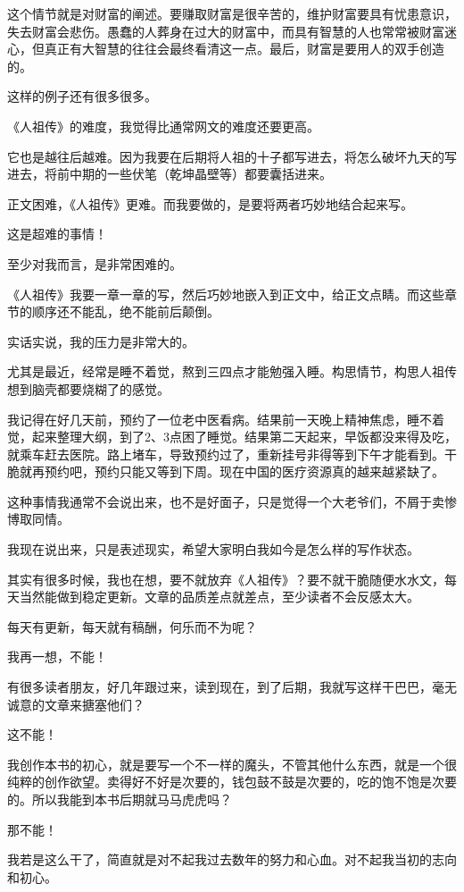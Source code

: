 \begin{this_body}
这个情节就是对财富的阐述。要赚取财富是很辛苦的，维护财富要具有忧患意识，失去财富会悲伤。愚蠢的人葬身在过大的财富中，而具有智慧的人也常常被财富迷心，但真正有大智慧的往往会最终看清这一点。最后，财富是要用人的双手创造的。

这样的例子还有很多很多。

《人祖传》的难度，我觉得比通常网文的难度还要更高。

它也是越往后越难。因为我要在后期将人祖的十子都写进去，将怎么破坏九天的写进去，将前中期的一些伏笔（乾坤晶壁等）都要囊括进来。

正文困难，《人祖传》更难。而我要做的，是要将两者巧妙地结合起来写。

这是超难的事情！

至少对我而言，是非常困难的。

《人祖传》我要一章一章的写，然后巧妙地嵌入到正文中，给正文点睛。而这些章节的顺序还不能乱，绝不能前后颠倒。

实话实说，我的压力是非常大的。

尤其是最近，经常是睡不着觉，熬到三四点才能勉强入睡。构思情节，构思人祖传想到脑壳都要烧糊了的感觉。

我记得在好几天前，预约了一位老中医看病。结果前一天晚上精神焦虑，睡不着觉，起来整理大纲，到了2、3点困了睡觉。结果第二天起来，早饭都没来得及吃，就乘车赶去医院。路上堵车，导致预约过了，重新挂号非得等到下午才能看到。干脆就再预约吧，预约只能又等到下周。现在中国的医疗资源真的越来越紧缺了。

这种事情我通常不会说出来，也不是好面子，只是觉得一个大老爷们，不屑于卖惨博取同情。

我现在说出来，只是表述现实，希望大家明白我如今是怎么样的写作状态。

其实有很多时候，我也在想，要不就放弃《人祖传》？要不就干脆随便水水文，每天当然能做到稳定更新。文章的品质差点就差点，至少读者不会反感太大。

每天有更新，每天就有稿酬，何乐而不为呢？

我再一想，不能！

有很多读者朋友，好几年跟过来，读到现在，到了后期，我就写这样干巴巴，毫无诚意的文章来搪塞他们？

这不能！

我创作本书的初心，就是要写一个不一样的魔头，不管其他什么东西，就是一个很纯粹的创作欲望。卖得好不好是次要的，钱包鼓不鼓是次要的，吃的饱不饱是次要的。所以我能到本书后期就马马虎虎吗？

那不能！

我若是这么干了，简直就是对不起我过去数年的努力和心血。对不起我当初的志向和初心。


\end{this_body}
